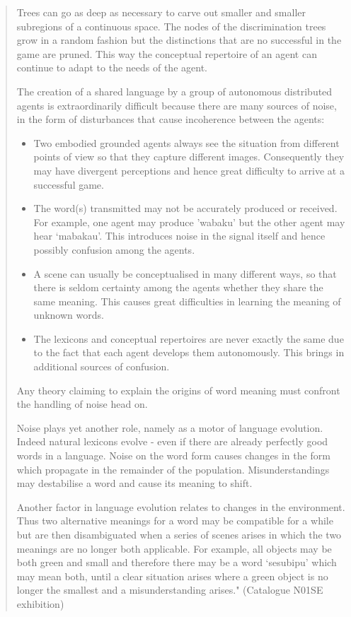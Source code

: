 \begin{quotation}
Trees can go as deep as necessary to carve out smaller and smaller subregions of a continuous space. The nodes
of the discrimination trees grow in a random fashion but the distinctions that are no successful in the game are 
pruned. This way the conceptual repertoire of an agent can continue to adapt to the needs of the agent. 

\vspace{1\baselineskip}

\noindent
The creation of a shared language by a group of autonomous distributed agents is extraordinarily difficult 
because there are many sources of noise, in the form of disturbances that cause incoherence between the agents: 
\begin{itemize} 
\item Two embodied grounded agents always see the situation from different points of view so that they capture 
different images. Consequently they may have divergent perceptions and hence great difficulty to arrive at a 
successful game. 
\item The word(s) transmitted may not be accurately produced or received. For example, one agent may produce 
'wabaku' but the other agent may hear `mabakau'. This introduces noise in the signal itself and hence 
possibly confusion among the agents. 
\item A scene can usually be conceptualised in many different ways, so that there is seldom certainty among 
the agents whether they share the same meaning. This causes great difficulties in learning 
the meaning of unknown words. 
\item The lexicons and conceptual repertoires are never exactly the same due to the fact that each agent
develops them autonomously. This brings in additional sources of confusion. 
\end{itemize}
Any theory claiming to explain the origins of word meaning must confront the handling of 
noise head on. 

\vspace{1\baselineskip}

\noindent
Noise plays yet another role, namely as a motor of language evolution. Indeed natural lexicons evolve - 
even if there are already perfectly good words in a language. Noise on the word form causes changes 
in the form which propagate in the remainder of the population. Misunderstandings may destabilise a
word and cause its meaning to shift. 

Another factor in language evolution relates to changes in the environment. Thus two alternative 
meanings for a word may be compatible for a while but are then disambiguated when a series of scenes
arises in which the two meanings are no longer both applicable. For example, all objects may be both 
green and small and therefore there may be a word `sesubipu' which may mean both, until a clear 
situation arises where a green object is no longer the smallest and a misunderstanding arises." (Catalogue N01SE exhibition)
\end{quotation}

